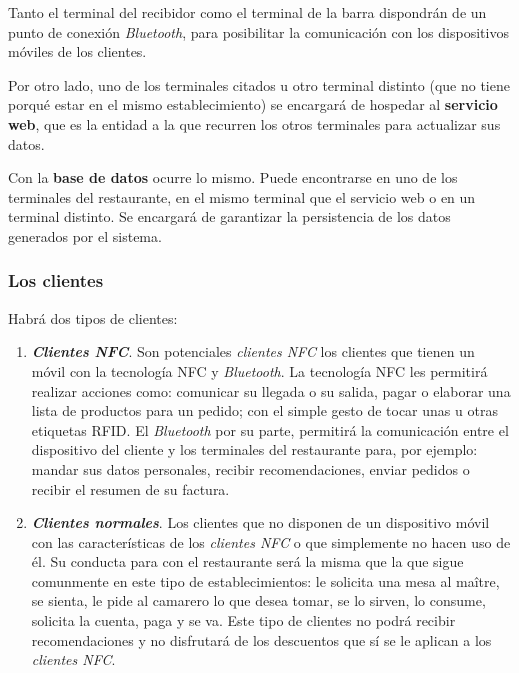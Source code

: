   Tanto el terminal del recibidor como el terminal de la barra dispondrán
  de un punto de conexión \emph{Bluetooth}, para posibilitar la comunicación
  con los dispositivos móviles de los clientes.

  Por otro lado, uno de los terminales citados u otro terminal distinto (que
  no tiene porqué estar en el mismo establecimiento) se encargará de hospedar
  al \textbf{servicio web}, que es la entidad a la que recurren los otros
  terminales para actualizar sus datos.

  Con la \textbf{base de datos} ocurre lo mismo. Puede encontrarse en uno de
  los terminales del restaurante, en el mismo terminal que el servicio web o
  en un terminal distinto. Se encargará de garantizar la persistencia de los
  datos generados por el sistema.



    \subsubsection{Los clientes}
  Habrá dos tipos de clientes:
  \begin{enumerate}
  \item \emph{\textbf{Clientes \acs{NFC}}}. Son potenciales \emph{clientes
  \acs{NFC}} los clientes que tienen un móvil con la tecnología \acs{NFC} y
  \emph{Bluetooth}. La tecnología \acs{NFC} les permitirá realizar acciones
  como: comunicar su llegada o su salida, pagar o elaborar una lista de
  productos para un pedido; con el simple gesto de tocar unas u otras
  etiquetas \acs{RFID}. El \emph{Bluetooth} por su parte, permitirá la
  comunicación entre el dispositivo del cliente y los terminales del
  restaurante para, por ejemplo: mandar sus datos personales, recibir
  recomendaciones, enviar pedidos o recibir el resumen de su factura.
  \item \emph{\textbf{Clientes normales}}. Los clientes que no disponen
  de un dispositivo móvil con las características de los \emph{clientes
  \acs{NFC}} o que simplemente no hacen uso de él. Su conducta para con
  el restaurante será la misma que la que sigue comunmente en este tipo
  de establecimientos: le solicita una mesa al maître, se sienta, le
  pide al camarero lo que desea tomar, se lo sirven, lo consume, solicita
  la cuenta, paga y se va. Este tipo de clientes no podrá recibir
  recomendaciones y no disfrutará de los descuentos que sí se le aplican
  a los \emph{clientes \acs{NFC}}.
  \end{enumerate}

